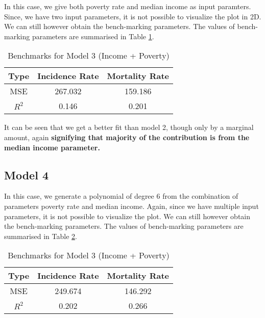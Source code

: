 \documentclass[conference]{IEEEtran}
\begin{document}
In this case, we give both poverty rate and median income as input paramters. Since, we have two input parameters, it is not possible to visualize the plot in 2D. We can still however obtain the bench-marking parameters. The values of bench-marking parameters are summarised in Table \ref{tab_m3}.

\begin{table}
\begin{center}

\caption{Benchmarks for Model 3 (Income + Poverty)}

\begin{tabular}{| c| c| c| }
 \hline
 Type & Incidence Rate& Mortality Rate \\ 
 \hline
 MSE & 267.032 & 159.186 \\  
 \hline
 $R^2$ & 0.146 & 0.201  \\
 \hline

\end{tabular}
 \label{tab_m3}
\end{center}

\end{table}

It can be seen that we get a better fit than model 2, though only by a marginal amount, again \textbf{signifying that majority of the contribution is from the median income parameter.}

\subsection{Model 4}

In this case, we generate a polynomial of degree 6 from the combination of parameters poverty rate and median income. Again, since we have multiple input parameters, it is not possible to visualize the plot. We can still however obtain the bench-marking parameters. The values of bench-marking parameters are summarised in Table \ref{tab_m4}.

\begin{table}
\begin{center}

\caption{Benchmarks for Model 3 (Income + Poverty)}

\begin{tabular}{| c| c| c| }
 \hline
 Type & Incidence Rate& Mortality Rate \\ 
 \hline
 MSE & 249.674 & 146.292 \\  
 \hline
 $R^2$ & 0.202 & 0.266  \\
 \hline

\end{tabular}
 \label{tab_m4}
\end{center}

\end{table}
\end{document}
